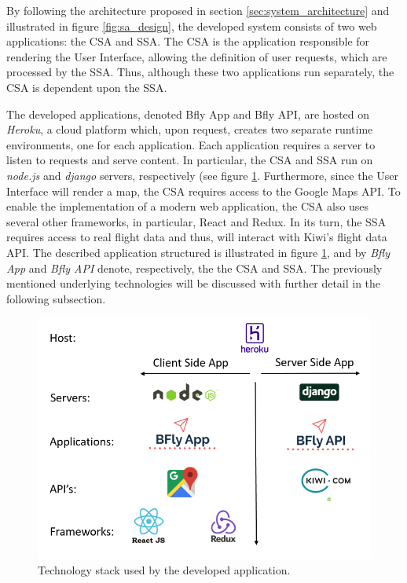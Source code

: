By following the architecture proposed in section \ref{sec:system_architecture} and illustrated in figure \ref{fig:sa_design}, the developed system consists of two web applications: the CSA and SSA. The CSA is the application responsible for rendering the User Interface, allowing the definition of user requests, which are processed by the SSA. Thus, although these two applications run separately, the CSA is dependent upon the SSA. 



The developed applications, denoted Bfly App and Bfly API, are hosted on \textit{Heroku}, a cloud platform which, upon request, creates two separate runtime environments, one for each application. Each application requires a server to listen to requests and serve content. In particular, the CSA and SSA run on \textit{node.js} and \textit{django} servers, respectively (see figure \ref{fig:sa_structure}. Furthermore, since the User Interface will render a map, the CSA requires access to the Google Maps API. To enable the implementation of a modern web application, the CSA also uses several other frameworks, in particular, React and Redux. In its turn, the SSA requires access to real flight data and thus, will interact with Kiwi's flight data API. The described application structured is illustrated in figure \ref{fig:sa_structure}, and by \textit{Bfly App} and \textit{Bfly API} denote, respectively, the the CSA and SSA. The previously mentioned underlying technologies will be discussed with further detail in the following subsection.  



\begin{figure}[htpb]
  \centering
  \includegraphics[width=.7\textwidth]{./Figures/system_implementation/stack.png}
  \caption{Technology stack used by the developed application.}
  \label{fig:sa_structure}  
\end{figure}


